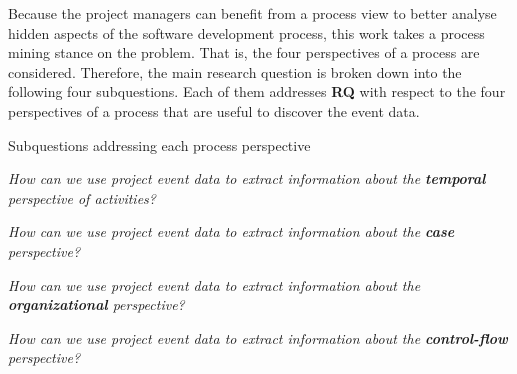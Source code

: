 Because the project managers can benefit from a process view to better analyse hidden aspects of the software development process, this work takes a process mining stance on the problem. That is, the four perspectives of a process \citep{DBLP:books/sp/Aalst16} are considered. Therefore, the main research question is broken down into the following four subquestions. Each of them addresses \textbf{RQ} with respect to the four perspectives of a process that are useful to discover the event data.


\begin{question}{Subquestions addressing each process perspective}
\begin{description}[\bfseries RQ 1.]
	\item[\bfseries RQ1.] \emph{How can we use project event data to extract information about the \textbf{temporal} perspective of activities?} 
	
	\item[\bfseries RQ2.] \emph{How can we use project event data to extract information about the \textbf{case} perspective?} 
	
	\item[\bfseries RQ3.] \emph{How can we use project event data to extract information about the \textbf{organizational} perspective?} 
	
	\item[\bfseries RQ4.] \emph{How can we use project event data to extract information about the \textbf{control-flow} perspective?} 
	
\end{description}
\end{question}
